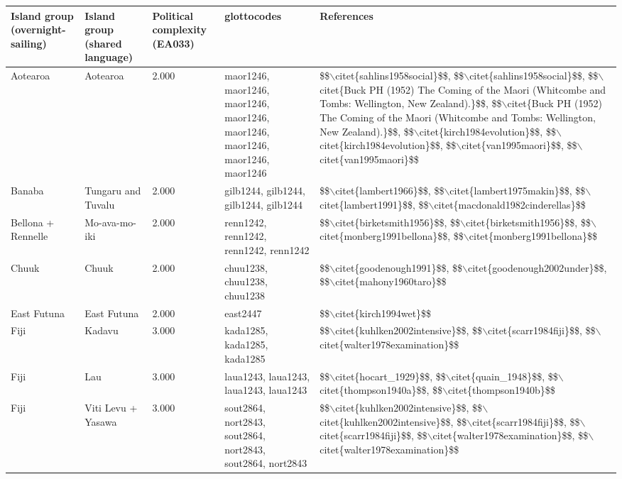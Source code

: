 \begin{longtable}{p{1.8cm}p{1.8cm}p{1.8cm}p{2cm}p{7cm}}
  \toprule
Island group (overnight-sailing) & Island group (shared language) & Political complexity (EA033) & glottocodes & References \\ 
  \midrule
Aotearoa & Aotearoa & 2.000 & maor1246, maor1246, maor1246, maor1246, maor1246, maor1246, maor1246, maor1246 & \$\$$\backslash$citet\{sahlins1958social\}\$\$, \$\$$\backslash$citet\{sahlins1958social\}\$\$, \$\$$\backslash$citet\{Buck PH (1952) The Coming of the Maori (Whitcombe and Tombs: Wellington, New Zealand).\}\$\$, \$\$$\backslash$citet\{Buck PH (1952) The Coming of the Maori (Whitcombe and Tombs: Wellington, New Zealand).\}\$\$, \$\$$\backslash$citet\{kirch1984evolution\}\$\$, \$\$$\backslash$citet\{kirch1984evolution\}\$\$, \$\$$\backslash$citet\{van1995maori\}\$\$, \$\$$\backslash$citet\{van1995maori\}\$\$ \\ 
  Banaba & Tungaru and Tuvalu & 2.000 & gilb1244, gilb1244, gilb1244, gilb1244 & \$\$$\backslash$citet\{lambert1966\}\$\$, \$\$$\backslash$citet\{lambert1975makin\}\$\$, \$\$$\backslash$citet\{lambert1991\}\$\$, \$\$$\backslash$citet\{macdonald1982cinderellas\}\$\$ \\ 
  Bellona + Rennelle & Mo-ava-mo-iki & 2.000 & renn1242, renn1242, renn1242, renn1242 & \$\$$\backslash$citet\{birketsmith1956\}\$\$, \$\$$\backslash$citet\{birketsmith1956\}\$\$, \$\$$\backslash$citet\{monberg1991bellona\}\$\$, \$\$$\backslash$citet\{monberg1991bellona\}\$\$ \\ 
  Chuuk & Chuuk & 2.000 & chuu1238, chuu1238, chuu1238 & \$\$$\backslash$citet\{goodenough1991\}\$\$, \$\$$\backslash$citet\{goodenough2002under\}\$\$, \$\$$\backslash$citet\{mahony1960taro\}\$\$ \\ 
  East Futuna & East Futuna & 2.000 & east2447 & \$\$$\backslash$citet\{kirch1994wet\}\$\$ \\ 
  Fiji & Kadavu & 3.000 & kada1285, kada1285, kada1285 & \$\$$\backslash$citet\{kuhlken2002intensive\}\$\$, \$\$$\backslash$citet\{scarr1984fiji\}\$\$, \$\$$\backslash$citet\{walter1978examination\}\$\$ \\ 
  Fiji & Lau & 3.000 & laua1243, laua1243, laua1243, laua1243 & \$\$$\backslash$citet\{hocart\_1929\}\$\$, \$\$$\backslash$citet\{quain\_1948\}\$\$, \$\$$\backslash$citet\{thompson1940a\}\$\$, \$\$$\backslash$citet\{thompson1940b\}\$\$ \\ 
  Fiji & Viti Levu + Yasawa & 3.000 & sout2864, nort2843, sout2864, nort2843, sout2864, nort2843 & \$\$$\backslash$citet\{kuhlken2002intensive\}\$\$, \$\$$\backslash$citet\{kuhlken2002intensive\}\$\$, \$\$$\backslash$citet\{scarr1984fiji\}\$\$, \$\$$\backslash$citet\{scarr1984fiji\}\$\$, \$\$$\backslash$citet\{walter1978examination\}\$\$, \$\$$\backslash$citet\{walter1978examination\}\$\$ \\ 

\end{longtable}
